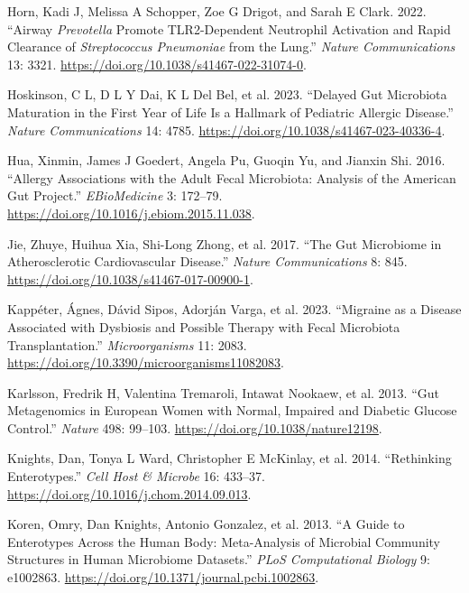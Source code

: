 \documentclass[
  11pt,
]{article}
\newlength{\cslhangindent}
\newenvironment{CSLReferences}[2] %
 {\begin{list}{}{%
  \setlength{\itemindent}{0pt}
  \setlength{\leftmargin}{0pt}
  \setlength{\parsep}{0pt}
  \ifodd #1
   \setlength{\leftmargin}{\cslhangindent}
   \setlength{\itemindent}{-1\cslhangindent}
  \fi
  \setlength{\itemsep}{#2\baselineskip}}}
 {\end{list}}
\begin{document}
\begin{CSLReferences}{1}{0}
Horn, Kadi J, Melissa A Schopper, Zoe G Drigot, and Sarah E Clark. 2022.
{``Airway \emph{{P}revotella} Promote {TLR2}-Dependent Neutrophil
Activation and Rapid Clearance of \emph{{S}treptococcus Pneumoniae} from
the Lung.''} \emph{Nature Communications} 13: 3321.
\url{https://doi.org/10.1038/s41467-022-31074-0}.

Hoskinson, C L, D L Y Dai, K L Del Bel, et al. 2023. {``Delayed Gut
Microbiota Maturation in the First Year of Life Is a Hallmark of
Pediatric Allergic Disease.''} \emph{Nature Communications} 14: 4785.
\url{https://doi.org/10.1038/s41467-023-40336-4}.

Hua, Xinmin, James J Goedert, Angela Pu, Guoqin Yu, and Jianxin Shi.
2016. {``Allergy Associations with the Adult Fecal Microbiota: Analysis
of the {A}merican {G}ut {P}roject.''} \emph{EBioMedicine} 3: 172--79.
\url{https://doi.org/10.1016/j.ebiom.2015.11.038}.

Jie, Zhuye, Huihua Xia, Shi-Long Zhong, et al. 2017. {``The Gut
Microbiome in Atherosclerotic Cardiovascular Disease.''} \emph{Nature
Communications} 8: 845.
\url{https://doi.org/10.1038/s41467-017-00900-1}.

Kappéter, Ágnes, Dávid Sipos, Adorján Varga, et al. 2023. {``Migraine as
a Disease Associated with Dysbiosis and Possible Therapy with Fecal
Microbiota Transplantation.''} \emph{Microorganisms} 11: 2083.
\url{https://doi.org/10.3390/microorganisms11082083}.

Karlsson, Fredrik H, Valentina Tremaroli, Intawat Nookaew, et al. 2013.
{``Gut Metagenomics in {E}uropean Women with Normal, Impaired and
Diabetic Glucose Control.''} \emph{Nature} 498: 99--103.
\url{https://doi.org/10.1038/nature12198}.

Knights, Dan, Tonya L Ward, Christopher E McKinlay, et al. 2014.
{``Rethinking Enterotypes.''} \emph{Cell Host \& Microbe} 16: 433--37.
\url{https://doi.org/10.1016/j.chom.2014.09.013}.

Koren, Omry, Dan Knights, Antonio Gonzalez, et al. 2013. {``A Guide to
Enterotypes Across the Human Body: Meta-Analysis of Microbial Community
Structures in Human Microbiome Datasets.''} \emph{PLoS Computational
Biology} 9: e1002863.
\url{https://doi.org/10.1371/journal.pcbi.1002863}.


\end{CSLReferences}
\end{document}
